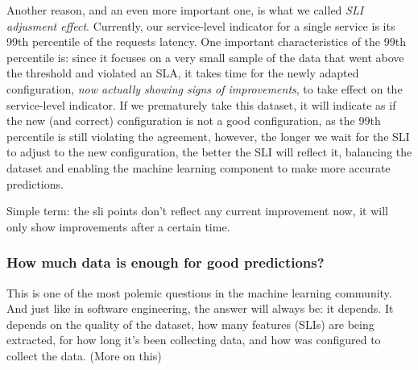 Another reason, and an even more important one, is what we called \emph{SLI adjusment effect}. Currently, our service-level indicator for a single service is its 99th percentile of the requests latency. One important characteristics of the 99th percentile is: since it focuses on a very small sample of the data that went above the threshold and violated an SLA, it takes time for the newly adapted configuration, \emph{now actually showing signs of improvements}, to take effect on the service-level indicator. If we prematurely take this dataset, it will indicate as if the new (and correct) configuration is not a good configuration, as the 99th percentile is still violating the agreement, however, the longer we wait for the SLI to adjust to the new configuration, the better the SLI will reflect it, balancing the dataset and enabling the machine learning component to make more accurate predictions.

Simple term: the sli points don't reflect any current improvement now, it will only show improvements after a certain time.

\subsubsection{How much data is enough for good predictions?}

This is one of the most polemic questions in the machine learning community. And just like in software engineering, the answer will always be: it depends. It depends on the quality of the dataset, how many features (SLIs) are being extracted, for how long it's been collecting data, and how \projectname{} was configured to collect the data. (More on this)
